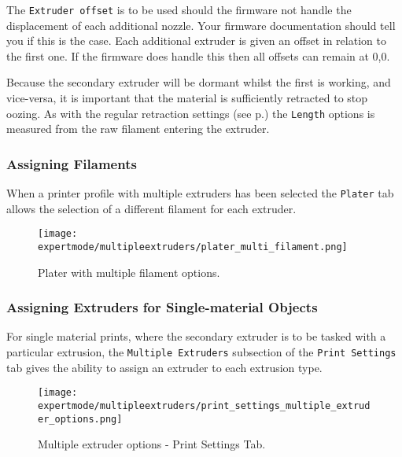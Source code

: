 
The \texttt{Extruder offset} is to be used should the firmware not handle the displacement of each additional nozzle.  Your firmware documentation should tell you if this is the case.  Each additional extruder is given an offset in relation to the first one.  If the firmware does handle this then all offsets can remain at 0,0.

Because the secondary extruder will be dormant whilst the first is working, and vice-versa, it is important that the material is sufficiently retracted to stop oozing.  As with the regular retraction settings (see p.\pageref{fig:retraction_settings}) the \texttt{Length} options is measured from the raw filament entering the extruder.


\subsubsection{Assigning Filaments} %
\label{sub:assigning_filaments}
When a printer profile with multiple extruders has been selected the \texttt{Plater} tab allows the selection of a different filament for each extruder.

\begin{figure}[H]
\centering
\texttt{[image: expertmode/multipleextruders/plater\_multi\_filament.png]}
\caption{Plater with multiple filament options.}
\label{fig:plater_multi_filament}
\end{figure}


\subsubsection{Assigning Extruders for Single-material Objects} %
\label{sub:assigning_extruders}

For single material prints, where the secondary extruder is to be tasked with a particular extrusion, the \texttt{Multiple Extruders} subsection of the \texttt{Print Settings} tab gives the ability to assign an extruder to each extrusion type.

\begin{figure}[H]
\centering
\texttt{[image: expertmode/multipleextruders/print\_settings\_multiple\_extruder\_options.png]}
\caption{Multiple extruder options - Print Settings Tab.}
\label{fig:advanced_multiple_extruder_options}
\end{figure}

